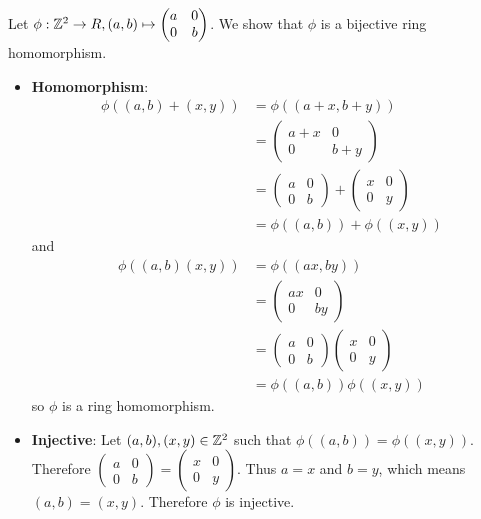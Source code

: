 \begin{questions}
    \item Let $\phi: \mathbb{Z}^2 \to R, (a,b)\mapsto \begin{pmatrix}a&0\\0&b\end{pmatrix}$. We show that $\phi$ is a bijective ring homomorphism.
    \begin{itemize}
        \item \textbf{Homomorphism}:
        \begin{align*}
            \phi((a,b) + (x,y)) &= \phi((a+x,b+y))\\
            &= \begin{pmatrix}a+x&0\\0&b+y\end{pmatrix}\\
            &= \begin{pmatrix}a&0\\0&b\end{pmatrix} + \begin{pmatrix}x&0\\0&y\end{pmatrix}\\
            &= \phi((a,b)) + \phi((x,y))
        \end{align*}
        and
        \begin{align*}
            \phi((a,b)(x,y)) &= \phi((ax,by))\\
            &= \begin{pmatrix}ax&0\\0&by\end{pmatrix}\\
            &= \begin{pmatrix}a&0\\0&b\end{pmatrix}\begin{pmatrix}x&0\\0&y\end{pmatrix}\\
            &= \phi((a,b))\phi((x,y))
        \end{align*}
        so $\phi$ is a ring homomorphism.

        \item \textbf{Injective}: Let $(a, b), (x, y) \in \mathbb{Z}^2$ such that $\phi((a,b)) = \phi((x,y))$. Therefore $\begin{pmatrix}a&0\\0&b\end{pmatrix} = \begin{pmatrix}x&0\\0&y\end{pmatrix}$. Thus $a = x$ and $b = y$, which means $(a,b) = (x,y)$. Therefore $\phi$ is injective.


\end{itemize}
\end{questions}
